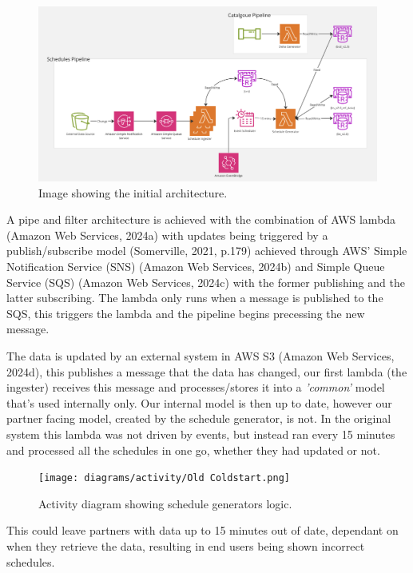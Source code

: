   \begin{figure}[H]
    \centering
    \includegraphics[width=12cm]{assets/architectures/starting.png}
    \caption{Image showing the initial architecture.}
    \label{fig:initialArchitecture}
  \end{figure}

  A pipe and filter architecture is achieved with the combination of AWS lambda (Amazon Web Services, 2024a) with updates being triggered by a publish/subscribe 
  model (Somerville, 2021, p.179) achieved through AWS' Simple Notification Service (SNS) (Amazon Web Services, 2024b) and Simple Queue Service (SQS) 
  (Amazon Web Services, 2024c) with the former publishing and the latter subscribing. The lambda only runs when a message is published to the SQS, this triggers 
  the lambda and the pipeline begins precessing the new message.

  The data is updated by an external system in AWS S3 (Amazon Web Services, 2024d), this publishes a message that the data has changed, our first lambda 
  (the ingester) receives this message and processes/stores it into a \textit{'common'} model that's used internally only. Our internal model is then up to date,
  however our partner facing model, created by the schedule generator, is not. In the original system this lambda was not driven by events, but instead ran every
  15 minutes and processed all the schedules in one go, whether they had updated or not. 
  
  \begin{figure}[H]
    \centering
    \texttt{[image: diagrams/activity/Old Coldstart.png]}
    \caption{Activity diagram showing schedule generators logic.}
    \label{fig:oldColdstart}
  \end{figure}

  This could leave partners with data up to 15 minutes out of date, dependant on when they retrieve the data, resulting in end users being shown incorrect
  schedules. 

